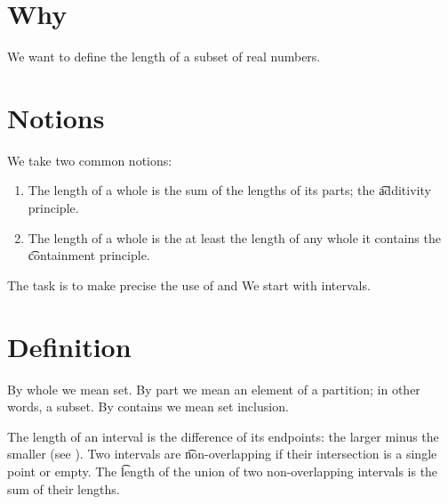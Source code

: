 

\section*{Why}

We want to define the length of a subset of real numbers.

\section*{Notions}

We take two common notions:

\begin{enumerate}
  \item The length of a whole is the sum of the lengths of its parts; the \t{additivity principle}.
  \item The length of a whole is the at least the length of any whole it contains the \t{containment principle}.
\end{enumerate}
The task is to make precise the use of   and 
We start with intervals.

\section*{Definition}

By whole we mean set.
By part we mean an element of a partition; in other words, a subset.
By contains we mean set inclusion.

The length of an interval is the difference of its endpoints: the larger minus the smaller (see ).
Two intervals are \t{non-overlapping} if their intersection is a single point or empty.
The \t{length} of the union of two non-overlapping intervals is the sum of their lengths.

